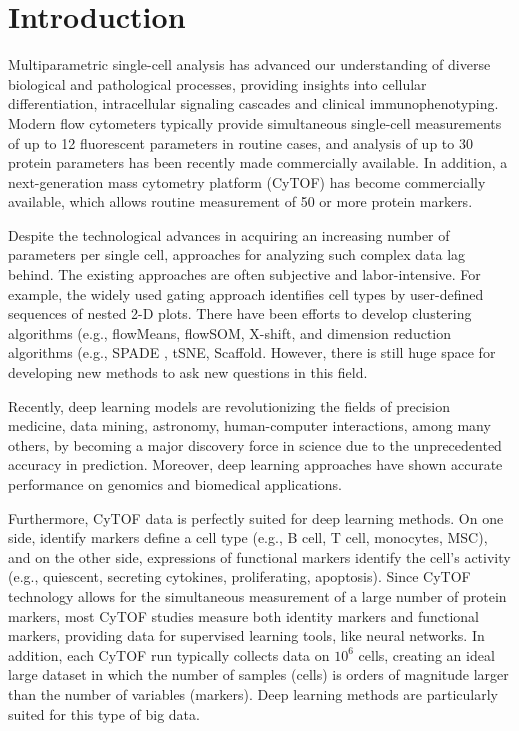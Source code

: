 \documentclass[graybox]{svmult}
\begin{document}
\section{Introduction}

Multiparametric single-cell analysis has advanced our understanding of
diverse biological and pathological processes, providing insights into
cellular differentiation, intracellular signaling cascades and
clinical immunophenotyping. Modern flow cytometers typically provide
simultaneous single-cell measurements of up to 12 fluorescent
parameters in routine cases, and analysis of up to 30 protein
parameters has been recently made commercially available. In addition,
a next-generation mass cytometry platform (CyTOF) has become
commercially available, which allows routine measurement of 50 or more
protein markers.

Despite the technological advances in acquiring an increasing number
of parameters per single cell, approaches for analyzing such complex
data lag behind. The existing approaches are often subjective and
labor-intensive. For example, the widely used gating approach
identifies cell types by user-defined sequences of nested 2-D
plots. There have been efforts to develop clustering algorithms (e.g.,
flowMeans\cite{Aghaeepour2010}, flowSOM\cite{VanGassen2015},
X-shift\cite{Samusik2016}, and dimension reduction algorithms
(e.g., SPADE \cite{Qiu2011}, tSNE\cite{vanderMaaten2008},
Scaffold\cite{Spitzer2015}. However, there is still huge space
for developing new methods to ask new questions in this field.

Recently, deep learning models are revolutionizing the fields of
precision medicine, data mining, astronomy, human-computer
interactions, among many others, by becoming a major discovery force
in science due to the unprecedented accuracy in prediction.  Moreover,
deep learning approaches have shown accurate performance on genomics
and biomedical
applications\cite{Ciresan2013,Denas2013,Fakoor2013,Leung2014,CruzRoa2014,Li2017,Mobadersany2018}.

Furthermore, CyTOF data is perfectly suited for deep learning methods.
On one side, identify markers define a cell type (e.g., B cell, T
cell, monocytes, MSC), and on the other side, expressions of
functional markers identify the cell's activity (e.g., quiescent,
secreting cytokines, proliferating, apoptosis). Since CyTOF technology
allows for the simultaneous measurement of a large number of protein
markers, most CyTOF studies measure both identity markers and
functional markers, providing data for supervised learning tools, like
neural networks.  In addition, each CyTOF run typically collects data
on $10^6$ cells, creating an ideal large dataset in which the number
of samples (cells) is orders of magnitude larger than the number of
variables (markers). Deep learning methods are particularly suited for
this type of big data.
\end{document}
